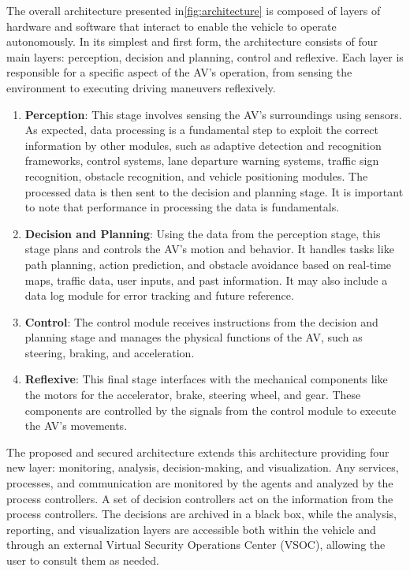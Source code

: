 The overall architecture presented in\ref{fig:architecture} is composed of layers of hardware and software that interact to enable the vehicle to operate autonomously.
In its simplest and first form, the architecture consists of four main layers: perception, decision and planning, control and reflexive.
Each layer is responsible for a specific aspect of the AV's operation, from sensing the environment to executing driving maneuvers reflexively\cite{architecture}.

\begin{enumerate}
    \item \textbf{Perception}: This stage involves sensing the AV's surroundings using sensors.
    As expected, data processing is a fundamental step to exploit the correct information by other modules, such as adaptive detection and recognition frameworks, control systems, lane departure warning systems, traffic sign recognition, obstacle recognition, and vehicle positioning modules.
    The processed data is then sent to the decision and planning stage.
    It is important to note that performance in processing the data is fundamentals.
    \item \textbf{Decision and Planning}: Using the data from the perception stage, this stage plans and controls the AV's motion and behavior.
    It handles tasks like path planning, action prediction, and obstacle avoidance based on real-time maps, traffic data, user inputs, and past information.
    It may also include a data log module for error tracking and future reference.
    \item \textbf{Control}: The control module receives instructions from the decision and planning stage and manages the physical functions of the AV, such as steering, braking, and acceleration.
    \item \textbf{Reflexive}: This final stage interfaces with the mechanical components like the motors for the accelerator, brake, steering wheel, and gear.
    These components are controlled by the signals from the control module to execute the AV’s movements.
\end{enumerate}

The proposed and secured architecture extends this architecture providing four new layer: monitoring, analysis, decision-making, and visualization.
Any services, processes, and communication are monitored by the agents and analyzed by the process controllers.
A set of decision controllers act on the information from the process controllers.
The decisions are archived in a black box, while the analysis, reporting, and visualization layers are accessible both within the vehicle and through an external Virtual Security Operations Center (VSOC), allowing the user to consult them as needed\cite{adu-kyere2023self-aware}.

